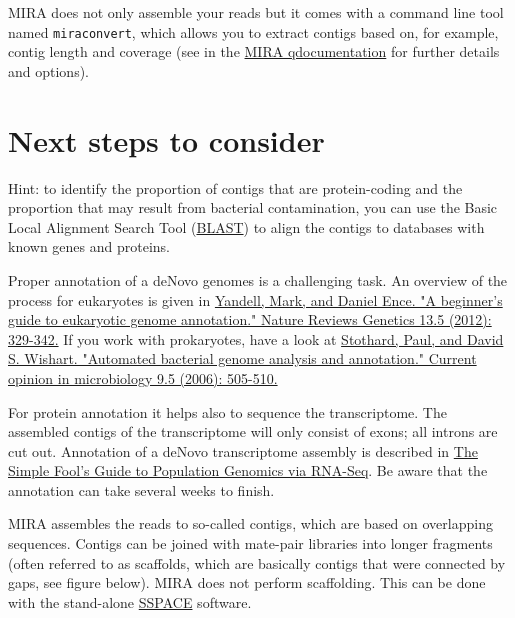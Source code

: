 \documentclass[11pt]{article}
\begin{document}
MIRA does not only assemble your reads but it comes with a command
line tool named \texttt{miraconvert}, which allows you to extract contigs
based on, for example, contig length and coverage (see in the \href{http://mira-assembler.sourceforge.net/docs/DefinitiveGuideToMIRA.pdf}{MIRA qdocumentation} for further details and options).




\section{Next steps to consider}
\label{sec-3}

Hint: to identify the proportion of contigs that are protein-coding
and the proportion that may result from bacterial contamination, you
can use the Basic Local Alignment Search Tool (\href{http://blast.ncbi.nlm.nih.gov/Blast.cgi}{BLAST}) to align the
contigs to databases with known genes and proteins.

Proper annotation of a deNovo genomes is a challenging task. An
overview of the process for eukaryotes is given in
\href{http://www.marcottelab.org/users/BIO337_2014/EukGeneAnnotation.pdf}{Yandell, Mark, and Daniel Ence. "A beginner's guide to eukaryotic genome annotation." Nature Reviews Genetics 13.5 (2012): 329-342.}
If you work with prokaryotes, have a look at \href{http://stothard.afns.ualberta.ca/public_html/papers/curr_opin_microbiol_bacterial_annotation.pdf}{Stothard, Paul, and David S. Wishart. "Automated bacterial genome analysis and annotation." Current opinion in microbiology 9.5 (2006): 505-510.}

For protein annotation it helps also to sequence the
transcriptome. The assembled contigs of the transcriptome will only
consist of exons; all introns are cut out. Annotation of a deNovo
transcriptome assembly is described in \href{http://sfg.stanford.edu/BLAST.html}{The Simple Fool's Guide to
Population Genomics via RNA-Seq}. Be aware that the annotation can take several weeks to finish.

MIRA assembles the reads to so-called contigs, which are based on
overlapping sequences. Contigs can be joined with mate-pair libraries
into longer fragments (often referred to as scaffolds, which are
basically contigs that were connected by gaps, see figure below). MIRA
does not perform scaffolding. This can be done with the stand-alone
\href{http://www.baseclear.com/genomics/bioinformatics/basetools/SSPACE}{SSPACE} software.
\end{document}
